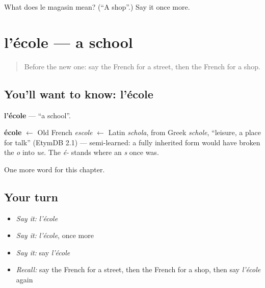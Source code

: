 \begin{tcolorbox}[breakable,colback=teal!4,colframe=teal!35!black,title={Before you move on}]
What does le magasin mean? (\textquotedblleft{}A shop\textquotedblright{}.) Say it once more.
\end{tcolorbox}
\section[l'école]{l'école — a school}

\label{lesson:FR-C99-ecole}



\begin{quote}
Before the new one: say the French for a street, then the French for a shop.
\end{quote}

\subsection*{You'll want to know: l'école}
\textbf{l'école} — \textquotedblleft{}a school\textquotedblright{}.

\begin{cousinweb}
\textbf{école} $\leftarrow$ Old French \emph{escole} $\leftarrow$ Latin \emph{schola}, from Greek \emph{schole}, \textquotedblleft{}leisure, a place for talk\textquotedblright{} (EtymDB 2.1) — semi-learned: a fully inherited form would have broken the \emph{o} into \emph{ue}. The \emph{é-} stands where an \emph{s} once was.
\end{cousinweb}

\begin{grammarlens}[title={What you've built}]
One more word for this chapter.
\end{grammarlens}

\subsection*{Your turn}
\begin{itemize}
\raggedright
  \item \emph{Say it:} \emph{l'école}
  \item \emph{Say it:} \emph{l'école}, once more
  \item \emph{Say it:} say \emph{l'école}
  \item \emph{Recall:} say the French for a street, then the French for a shop, then say \emph{l'école} again
\end{itemize}

